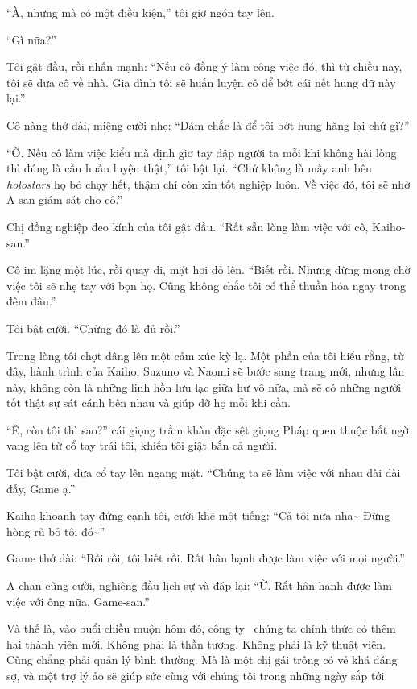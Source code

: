 \documentclass[../main.tex]{subfiles}
\begin{document}
``À, nhưng mà có một điều kiện,'' tôi giơ ngón tay lên.

``Gì nữa?''

Tôi gật đầu, rồi nhấn mạnh: ``Nếu cô đồng ý làm công việc đó, thì từ chiều nay, tôi sẽ đưa cô về nhà. Gia đình tôi sẽ huấn luyện cô để bớt cái nết hung dữ này lại.''

Cô nàng thở dài, miệng cười nhẹ: ``Dám chắc là để tôi bớt hung hăng lại chứ gì?''

``Ờ. Nếu cô làm việc kiểu mà định giơ tay đập người ta mỗi khi không hài lòng thì đúng là cần huấn luyện thật,'' tôi bật lại. ``Chứ không là mấy anh bên \textit{holostars} họ bỏ chạy hết, thậm chí còn xin tốt nghiệp luôn. Về việc đó, tôi sẽ nhờ A-san giám sát cho cô.''

Chị đồng nghiệp đeo kính của tôi gật đầu. ``Rất sẵn lòng làm việc với cô, Kaiho-san.''

Cô im lặng một lúc, rồi quay đi, mặt hơi đỏ lên. ``Biết rồi. Nhưng đừng mong chờ việc tôi sẽ nhẹ tay với bọn họ. Cũng không chắc tôi có thể thuần hóa ngay trong đêm đâu.''

Tôi bật cười. ``Chừng đó là đủ rồi.''

Trong lòng tôi chợt dâng lên một cảm xúc kỳ lạ. Một phần của tôi hiểu rằng, từ đây, hành trình của Kaiho, Suzuno và Naomi sẽ bước sang trang mới, nhưng lần này, không còn là những linh hồn lưu lạc giữa hư vô nữa, mà sẽ có những người tốt thật sự sát cánh bên nhau và giúp đỡ họ mỗi khi cần.

``Ê, còn tôi thì sao?'' cái giọng trầm khàn đặc sệt giọng Pháp quen thuộc bất ngờ vang lên từ cổ tay trái tôi, khiến tôi giật bắn cả người.

Tôi bật cười, đưa cổ tay lên ngang mặt. ``Chúng ta sẽ làm việc với nhau dài dài đấy, Game ạ.''

Kaiho khoanh tay đứng cạnh tôi, cười khẽ một tiếng: ``Cả tôi nữa nha\~{} Đừng hòng rũ bỏ tôi đó\~{}''

Game thở dài: ``Rồi rồi, tôi biết rồi. Rất hân hạnh được làm việc với mọi người.''

A-chan cũng cười, nghiêng đầu lịch sự và đáp lại: ``Ừ. Rất hân hạnh được làm việc với ông nữa, Game-san.''

Và thế là, vào buổi chiều muộn hôm đó, công ty \hll\ chúng ta chính thức có thêm hai thành viên mới. Không phải là thần tượng. Không phải là kỹ thuật viên. Cũng chẳng phải quản lý bình thường. Mà là một chị gái trông có vẻ khá đáng sợ, và một trợ lý ảo sẽ giúp sức cùng với chúng tôi trong những ngày sắp tới.
\end{document}
